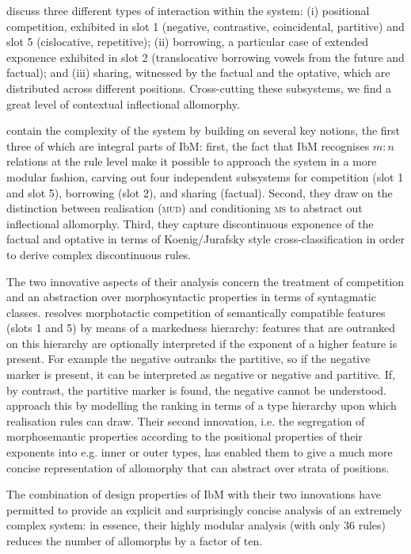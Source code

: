 \documentclass[output=paper
	        ,collection
	        ,collectionchapter
 	        ,biblatex
                ,babelshorthands
                ,newtxmath
                ,draftmode
                ,colorlinks, citecolor=brown
]{langscibook}
\begin{document}
\begin{exe}
\begin{xlist}
\begin{exe}
\begin{xlist}
\citet{diaz:koenig:michelson:19} discuss three different types of
interaction within the system: (i) positional competition, exhibited
in slot 1 (negative, contrastive, coincidental, partitive) and slot 5
(cislocative, repetitive); (ii) borrowing, a particular case of
extended exponence exhibited in slot 2 (translocative borrowing vowels
from the future and factual); and (iii) sharing, witnessed by the
factual and the optative, which are distributed across different
positions. Cross-cutting these subsystems, we find a great level of
contextual inflectional allomorphy.

\citet{diaz:koenig:michelson:19} contain the complexity of the system
by building on several key notions, the first three of
which are integral parts of IbM: first, the fact that IbM recognises
$m:n$ relations at the rule level make it possible to approach the
 system in a more modular fashion, carving out four independent
subsystems for competition (slot 1 and slot 5), borrowing (slot 2), and
sharing (factual). Second, they draw on the distinction between
realisation (\textsc{mud}) and conditioning \textsc{ms} to abstract
out inflectional allomorphy. Third, they capture discontinuous
exponence of the factual and optative in terms of Koenig/Jurafsky
style cross-classification in order to derive complex discontinuous
rules.

The two innovative aspects of their analysis concern the treatment of
competition and an abstraction over morphosyntactic properties in
terms of syntagmatic classes.  resolves morphotactic competition
of semantically compatible features (slots 1 and 5) by means of a
markedness hierarchy: features that are outranked on this hierarchy
are optionally interpreted if the exponent of a higher feature is
present. For example the negative outranks the partitive, so if the negative
marker is present, it can be interpreted as negative or negative and
partitive. If, by contrast, the partitive marker is found, the
negative cannot be understood.  \citet{diaz:koenig:michelson:19}
approach this by modelling the ranking in terms of a type hierarchy
upon which realisation rules can draw. Their second innovation, i.e. 
the  segregation of morphosemantic properties according to
the positional properties of their exponents into e.g. inner or outer
types, has enabled them to give a much more concise representation of
allomorphy that can abstract over strata of positions. 

The combination of design properties of IbM with their two innovations
have permitted \citet{diaz:koenig:michelson:19} to provide an explicit
and surprisingly concise analysis of an extremely complex system: in
essence, their highly modular analysis (with only 36 rules) reduces the
number of allomorphs by a factor of ten.


\end{xlist}
\end{exe}
\end{xlist}
\end{exe}
\end{document}
